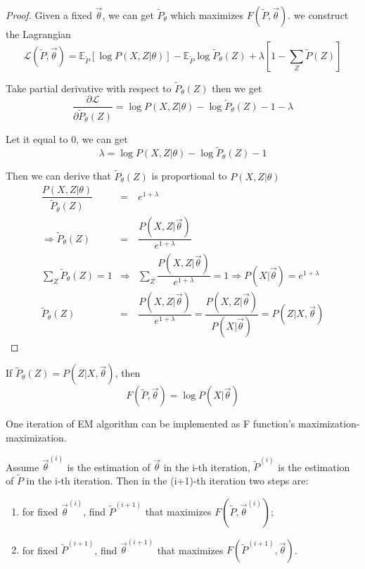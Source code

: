 \begin{proof}
Given a fixed $\vec{\theta}$, we can get $\tilde{P}_{\theta}$ which maximizes $F(\tilde{P},\vec{\theta})$. we construct the Lagrangian
\begin{equation}
\mathcal{L}(\tilde{P}, \vec{\theta})=\mathbb{E}_{\tilde{P}}\left[\log{P(X,Z|\theta)}\right]-\mathbb{E}_{\tilde{P}}\log\tilde{P}_{\theta}(Z)+\lambda\left[1-\sum\limits_Z{\tilde{P}(Z)}\right]
\end{equation}

Take partial derivative with respect to $\tilde{P}_{\theta}(Z)$ then we get
\begin{equation}
\dfrac{\partial \mathcal{L}}{\partial{\tilde{P}_{\theta}(Z)}}=\log{P(X,Z|\theta)}-\log\tilde{P}_{\theta}(Z)-1-\lambda  \nonumber
\end{equation}

Let it equal to 0, we can get
\begin{equation}
\lambda=\log{P(X,Z|\theta)}-\log\tilde{P}_{\theta}(Z)-1 \nonumber
\end{equation}

Then we can derive that $\tilde{P}_{\theta}(Z)$ is proportional to $P(X,Z|\theta)$
\begin{eqnarray}
\dfrac{P(X,Z|\theta)}{\tilde{P}_{\theta}(Z)} &=& e^{1+\lambda} \nonumber \\
\Rightarrow \tilde{P}_{\theta}(Z) &=& \dfrac{P(X,Z|\vec{\theta})}{e^{1+\lambda}} \nonumber \\
\sum\limits_Z{\tilde{P}_{\theta}(Z)}=1 & \Rightarrow & \sum\limits_Z{\dfrac{P(X,Z|\vec{\theta})}{e^{1+\lambda}}}=1 \Rightarrow P(X|\vec{\theta})=e^{1+\lambda} \nonumber \\
\tilde{P}_{\theta}(Z) &=& \dfrac{P(X,Z|\vec{\theta})}{e^{1+\lambda}} = \dfrac{P(X,Z|\vec{\theta})}{P(X|\vec{\theta})}=P(Z|X, \vec{\theta}) \nonumber
\end{eqnarray}
\end{proof}

\begin{lemma}
If $\tilde{P}_{\theta}(Z)=P(Z|X, \vec{\theta})$, then
\begin{equation}
F(\tilde{P},\vec{\theta})=\log P(X|\vec{\theta})
\end{equation}
\end{lemma}

\begin{theorem}
One iteration of EM algorithm can be implemented as F function's maximization-maximization.

Assume $\vec{\theta}^{(i)}$ is the estimation of $\vec{\theta}$ in the i-th iteration, $\tilde{P}^{(i)}$ is the estimation of $\tilde{P}$ in the i-th iteration. Then in the (i+1)-th iteration two steps are:
\begin{enumerate}
\item for fixed $\vec{\theta}^{(i)}$, find $\tilde{P}^{(i+1)}$ that maximizes $F(\tilde{P},\vec{\theta}^{(i)})$;
\item for fixed $\tilde{P}^{(i+1)}$, find $\vec{\theta}^{(i+1)}$ that maximizes $F(\tilde{P}^{(i+1)},\vec{\theta})$.
\end{enumerate}
\end{theorem}

